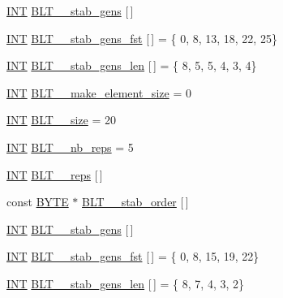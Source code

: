 \begin{DoxyCompactItemize}
\item 
\mbox{\hyperlink{galois_8h_a09fddde158a3a20bd2dcadb609de11dc}{I\+NT}} \mbox{\hyperlink{data___b_l_t_8_c_a9b5133ad231db14014368b5b992cdaf1}{B\+L\+T\+\_\+\_\+stab\+\_\+gens}} \mbox{[}$\,$\mbox{]}
\item 
\mbox{\hyperlink{galois_8h_a09fddde158a3a20bd2dcadb609de11dc}{I\+NT}} \mbox{\hyperlink{data___b_l_t_8_c_abf12e9d998b69b0d26acffb88ed32f07}{B\+L\+T\+\_\+\_\+stab\+\_\+gens\+\_\+fst}} \mbox{[}$\,$\mbox{]} = \{ 0, 8, 13, 18, 22, 25\}
\item 
\mbox{\hyperlink{galois_8h_a09fddde158a3a20bd2dcadb609de11dc}{I\+NT}} \mbox{\hyperlink{data___b_l_t_8_c_a005ca15c796833d7c3668fe8ebbade88}{B\+L\+T\+\_\+\_\+stab\+\_\+gens\+\_\+len}} \mbox{[}$\,$\mbox{]} = \{ 8, 5, 5, 4, 3, 4\}
\item 
\mbox{\hyperlink{galois_8h_a09fddde158a3a20bd2dcadb609de11dc}{I\+NT}} \mbox{\hyperlink{data___b_l_t_8_c_aadb723fc62d6f101962e6097204f1486}{B\+L\+T\+\_\+\_\+make\+\_\+element\+\_\+size}} = 0
\item 
\mbox{\hyperlink{galois_8h_a09fddde158a3a20bd2dcadb609de11dc}{I\+NT}} \mbox{\hyperlink{data___b_l_t_8_c_a3285d2af3d577d9c867b5b1dfb152f63}{B\+L\+T\+\_\+\_\+size}} = 20
\item 
\mbox{\hyperlink{galois_8h_a09fddde158a3a20bd2dcadb609de11dc}{I\+NT}} \mbox{\hyperlink{data___b_l_t_8_c_ab795010ed4acdd0cdaa7722089373b74}{B\+L\+T\+\_\+\_\+nb\+\_\+reps}} = 5
\item 
\mbox{\hyperlink{galois_8h_a09fddde158a3a20bd2dcadb609de11dc}{I\+NT}} \mbox{\hyperlink{data___b_l_t_8_c_a412e96e548400933bd0f8b923566958e}{B\+L\+T\+\_\+\_\+reps}} \mbox{[}$\,$\mbox{]}
\item 
const \mbox{\hyperlink{galois_8h_ab6cc7b4aeb6ea31aba2b3fbfc83ff5e6}{B\+Y\+TE}} $\ast$ \mbox{\hyperlink{data___b_l_t_8_c_a089b942fa1942106a85c7bcbdfaaca70}{B\+L\+T\+\_\+\_\+stab\+\_\+order}} \mbox{[}$\,$\mbox{]}
\item 
\mbox{\hyperlink{galois_8h_a09fddde158a3a20bd2dcadb609de11dc}{I\+NT}} \mbox{\hyperlink{data___b_l_t_8_c_a82cd9af2338f72a6ed54a6a1770803e9}{B\+L\+T\+\_\+\_\+stab\+\_\+gens}} \mbox{[}$\,$\mbox{]}
\item 
\mbox{\hyperlink{galois_8h_a09fddde158a3a20bd2dcadb609de11dc}{I\+NT}} \mbox{\hyperlink{data___b_l_t_8_c_a43eb4fdc2e033e3b5f49838797b07c38}{B\+L\+T\+\_\+\_\+stab\+\_\+gens\+\_\+fst}} \mbox{[}$\,$\mbox{]} = \{ 0, 8, 15, 19, 22\}
\item 
\mbox{\hyperlink{galois_8h_a09fddde158a3a20bd2dcadb609de11dc}{I\+NT}} \mbox{\hyperlink{data___b_l_t_8_c_aae93ddb0a168741e1170b10f5a844c5d}{B\+L\+T\+\_\+\_\+stab\+\_\+gens\+\_\+len}} \mbox{[}$\,$\mbox{]} = \{ 8, 7, 4, 3, 2\}

\end{DoxyCompactItemize}
